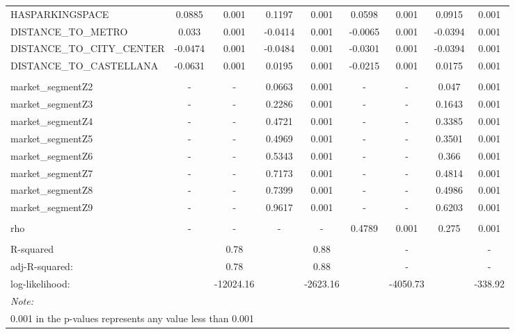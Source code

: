 \documentclass[Royal,times,sageh]{sagej}
\begin{document}
\begin{table}
{\begin{tabular}[t]{lcccccccc}
\hspace{1em}HASPARKINGSPACE & 0.0885 & 0.001 & 0.1197 & 0.001 & 0.0598 & 0.001 & 0.0915 & 0.001\\
\hspace{1em}DISTANCE\_TO\_METRO & 0.033 & 0.001 & -0.0414 & 0.001 & -0.0065 & 0.001 & -0.0394 & 0.001\\
\hspace{1em}DISTANCE\_TO\_CITY\_CENTER & -0.0474 & 0.001 & -0.0484 & 0.001 & -0.0301 & 0.001 & -0.0394 & 0.001\\
\hspace{1em}DISTANCE\_TO\_CASTELLANA & -0.0631 & 0.001 & 0.0195 & 0.001 & -0.0215 & 0.001 & 0.0175 & 0.001\\
\addlinespace[0.3em]
\multicolumn{9}{l}{\textbf{Market segments}}\\
\hspace{1em}market\_segmentZ2 & - & - & 0.0663 & 0.001 & - & - & 0.047 & 0.001\\
\hspace{1em}market\_segmentZ3 & - & - & 0.2286 & 0.001 & - & - & 0.1643 & 0.001\\
\hspace{1em}market\_segmentZ4 & - & - & 0.4721 & 0.001 & - & - & 0.3385 & 0.001\\
\hspace{1em}market\_segmentZ5 & - & - & 0.4969 & 0.001 & - & - & 0.3501 & 0.001\\
\hspace{1em}market\_segmentZ6 & - & - & 0.5343 & 0.001 & - & - & 0.366 & 0.001\\
\hspace{1em}market\_segmentZ7 & - & - & 0.7173 & 0.001 & - & - & 0.4814 & 0.001\\
\hspace{1em}market\_segmentZ8 & - & - & 0.7399 & 0.001 & - & - & 0.4986 & 0.001\\
\hspace{1em}market\_segmentZ9 & - & - & 0.9617 & 0.001 & - & - & 0.6203 & 0.001\\
\addlinespace[0.3em]
\multicolumn{9}{l}{\textbf{Spatial lag parameter}}\\
\hspace{1em}rho & - & - & - & - & 0.4789 & 0.001 & 0.275 & 0.001\\
\addlinespace[0.3em]
\multicolumn{9}{l}{\textbf{Model diagnostics}}\\
\hspace{1em}R-squared &  & 0.78 &  & 0.88 &  & - &  & -\\
\hspace{1em}adj-R-squared: &  & 0.78 &  & 0.88 &  & - &  & -\\
\hspace{1em}log-likelihood: &  & -12024.16 &  & -2623.16 &  & -4050.73 &  & -338.92\\
\bottomrule
\multicolumn{9}{l}{\rule{0pt}{1em}\textit{Note: }}\\
\multicolumn{9}{l}{\rule{0pt}{1em}0.001 in the p-values represents any value less than 0.001}\\
\end{tabular}}
\end{table}
\end{document}
